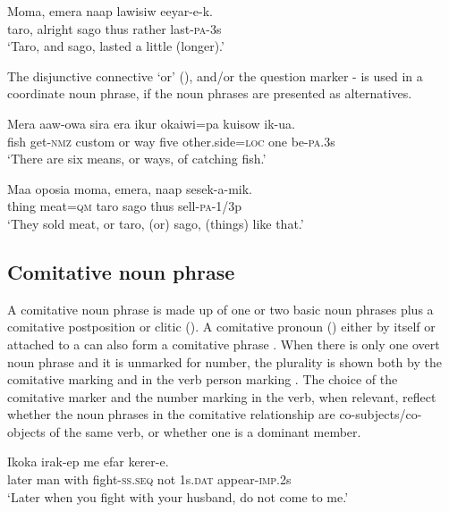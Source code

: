 \ea%
\label{ex:4:x816}
\gll Moma,    emera  naap  lawisiw  eeyar-e-k. \\
   taro,  alright  sago  thus  rather  last-\textsc{pa}-3s   \\
\glt`Taro, and sago, lasted a little (longer).'
\z

The disjunctive connective  `or' (), and/or the question marker -  is used in a coordinate noun phrase, if the noun phrases are presented as alternatives. 

\ea%
\label{ex:4:x817}
\gll Mera  aaw-owa  sira    era  ikur  okaiwi=pa  kuisow ik-ua. \\
   fish  get-\textsc{nmz}  custom  or  way  five  other.side=\textsc{loc}  one   be-\textsc{pa}.3s  \\
\glt`There are six means, or ways, of catching fish.'
\z

\ea%
\label{ex:4:x818}
\gll Maa  oposia  moma,  emera,  naap  sesek-a-mik. \\
  thing  meat=\textsc{qm}  taro  sago  thus  sell-\textsc{pa}-1/3p    \\
\glt`They sold meat, or taro, (or) sago, (things) like that.'
\z

\subsection{Comitative noun phrase} \label{sec:4.1.3}
{}
A comitative noun phrase is made up of one or two basic noun phrases plus a comitative postposition or clitic (). A comitative pronoun () either by itself or attached to a  can also form a comitative phrase . When there is only one overt noun phrase and it  is unmarked for number, the plurality is shown both by the comitative marking and in the verb person marking . The choice of the comitative marker and the number marking in the verb, when relevant,  reflect whether the noun phrases in the comitative relationship are co-subjects/co-objects of the same verb, or whether one is a dominant member. 

\ea%
\label{ex:4:x828}
\gll Ikoka     irak-ep  me  efar  kerer-e. \\
   later  man  with  fight-\textsc{ss}.\textsc{seq}  not  1s.\textsc{dat}  appear-\textsc{imp}.2s   \\
\glt`Later when you fight with your husband, do not come to me.'
\z

